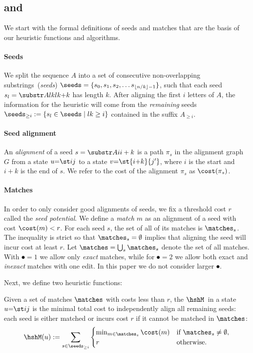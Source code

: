 \subsection{\Sh and \csh}\label{GLOBALsec:seedh}

We start with the formal definitions of seeds and matches that are the basis of
our heuristic functions and algorithms.

\paragraph{Seeds} We split the sequence $A$ into a set of consecutive
non-overlapping substrings~(\emph{seeds}) $\seeds=\{s_0, s_1, s_2, \dots
s_{\lfloor n/k \rfloor-1}\}$, such that each seed $s_l = \substr A{lk}{lk{+}k}$
has length $k$. After aligning the first $i$ letters of $A$, the information for
the heuristic will come from the \emph{remaining} seeds ${\seeds_{\geq i} :=
\{s_l \in \seeds \mid lk \geq i\}}$ contained in the suffix $A_{\geq i}$.

\paragraph{Seed alignment} An \emph{alignment} of a seed $s = \substr A{i}{i+k}$
is a path $\pi_s$ in the alignment graph $G$ from a state $u{=}\st ij$ to a state
$v{=}\st{i{+}k}{j'}$, where $i$ is the start and $i{+}k$ is the end of $s$. We refer
to the cost of the alignment $\pi_s$ as $\cost(\pi_s)$.

\paragraph{Matches}
In order to only consider good alignments of seeds, we fix a threshold cost $r$
called the \emph{seed potential}. We define a \emph{match} $m$ as an alignment of
a seed with cost ${\cost(m) < r}$. For each seed $s$, the set of all of its
matches is $\matches_s$. The inequality is strict so that $\matches_s=\emptyset$
implies that aligning the seed will incur cost at least $r$. Let $\matches =
\bigcup_s \matches_s$ denote the set of all matches. With $\spot{=}1$ we allow only
\emph{exact} matches, while for $\spot{=}2$ we allow both exact and
\emph{inexact} matches with one edit. In this paper we do not consider larger
$\spot$.

Next, we define two heuristic functions: 

\begin{definition}[\Sh]
  Given a set of matches $\matches$ with costs less than $r$, the \emph{\sh} $\hshM$\, in
  a state $u{=}\st ij$ is the minimal total cost to independently align all remaining
  seeds: each seed is either matched or incurs cost $r$ if it cannot be matched in
  $\matches$:
  \begin{equation}
    \hshM(u) := \sum_{s\in \seeds_{\geq i}} \begin{cases}
    \min_{m\in \matches_s} \cost(m) &\text{if $\matches_s \neq \emptyset$}, \\
    r &\text{otherwise.}
    \end{cases}
    \label{GLOBALeq:sh}
  \end{equation}
\end{definition}


